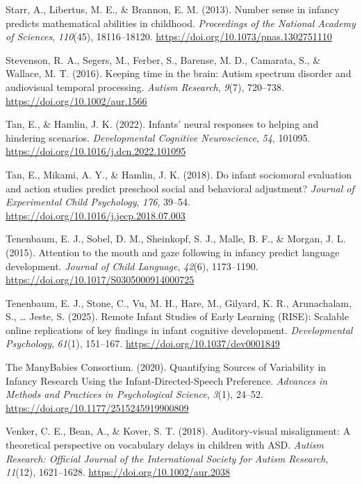 \documentclass[
  english,
  man,floatsintext]{apa6}
\newlength{\cslhangindent}
\newenvironment{CSLReferences}[2] %
 {\begin{list}{}{%
  \setlength{\itemindent}{0pt}
  \setlength{\leftmargin}{0pt}
  \setlength{\parsep}{0pt}
  \ifodd #1
   \setlength{\leftmargin}{\cslhangindent}
   \setlength{\itemindent}{-1\cslhangindent}
  \fi
  \setlength{\itemsep}{#2\baselineskip}}}
 {\end{list}}
\begin{document}
\begin{CSLReferences}{1}{0}
Starr, A., Libertus, M. E., \& Brannon, E. M. (2013). Number sense in infancy predicts mathematical abilities in childhood. \emph{Proceedings of the National Academy of Sciences}, \emph{110}(45), 18116--18120. \url{https://doi.org/10.1073/pnas.1302751110}

Stevenson, R. A., Segers, M., Ferber, S., Barense, M. D., Camarata, S., \& Wallace, M. T. (2016). Keeping time in the brain: {Autism} spectrum disorder and audiovisual temporal processing. \emph{Autism Research}, \emph{9}(7), 720--738. \url{https://doi.org/10.1002/aur.1566}

Tan, E., \& Hamlin, J. K. (2022). Infants' neural responses to helping and hindering scenarios. \emph{Developmental Cognitive Neuroscience}, \emph{54}, 101095. \url{https://doi.org/10.1016/j.dcn.2022.101095}

Tan, E., Mikami, A. Y., \& Hamlin, J. K. (2018). Do infant sociomoral evaluation and action studies predict preschool social and behavioral adjustment? \emph{Journal of Experimental Child Psychology}, \emph{176}, 39--54. \url{https://doi.org/10.1016/j.jecp.2018.07.003}

Tenenbaum, E. J., Sobel, D. M., Sheinkopf, S. J., Malle, B. F., \& Morgan, J. L. (2015). Attention to the mouth and gaze following in infancy predict language development. \emph{Journal of Child Language}, \emph{42}(6), 1173--1190. \url{https://doi.org/10.1017/S0305000914000725}

Tenenbaum, E. J., Stone, C., Vu, M. H., Hare, M., Gilyard, K. R., Arunachalam, S., \ldots{} Jeste, S. (2025). Remote {Infant Studies} of {Early Learning} ({RISE}): {Scalable} online replications of key findings in infant cognitive development. \emph{Developmental Psychology}, \emph{61}(1), 151--167. \url{https://doi.org/10.1037/dev0001849}

The ManyBabies Consortium. (2020). Quantifying {Sources} of {Variability} in {Infancy Research Using} the {Infant-Directed-Speech Preference}. \emph{Advances in Methods and Practices in Psychological Science}, \emph{3}(1), 24--52. \url{https://doi.org/10.1177/2515245919900809}

Venker, C. E., Bean, A., \& Kover, S. T. (2018). Auditory-visual misalignment: {A} theoretical perspective on vocabulary delays in children with {ASD}. \emph{Autism Research: Official Journal of the International Society for Autism Research}, \emph{11}(12), 1621--1628. \url{https://doi.org/10.1002/aur.2038}


\end{CSLReferences}
\end{document}

